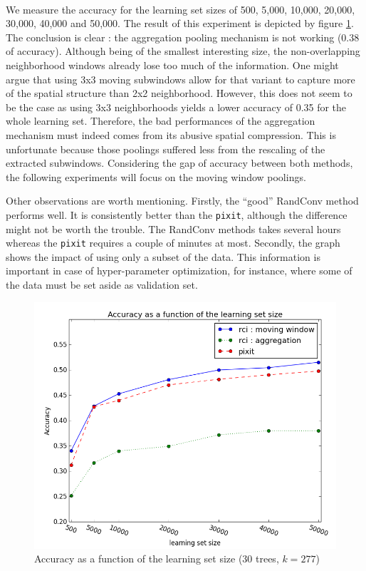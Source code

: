 \documentclass[a4paper]{report}
\begin{document}
		\paragraph{}
		We measure the accuracy for the learning set sizes of 500, 5,000, 10,000, 20,000, 30,000, 40,000 and 50,000. The result of this experiment is depicted by figure \ref{fig:accFLSsize}. The conclusion is clear : the aggregation pooling mechanism is not working (0.38 of accuracy). Although being of the smallest interesting size, the non-overlapping neighborhood windows already lose too much of the information. One might argue that using 3x3 moving subwindows allow for that variant to capture more of the spatial structure than 2x2 neighborhood. However, this does not seem to be the case as using 3x3 neighborhoods yields a lower accuracy of 0.35 for the whole learning set. Therefore, the bad performances of the aggregation mechanism must indeed comes from its abusive spatial compression. This is unfortunate because those poolings suffered less from the rescaling of the extracted subwindows. Considering the gap of accuracy between both methods, the following experiments will focus on the moving window poolings.
		\par
		Other observations are worth mentioning. Firstly, the ``good'' RandConv method performs well. It is consistently better than the \texttt{pixit}, although the difference might not be worth the trouble. The RandConv methods takes several hours whereas the \texttt{pixit} requires a couple of minutes at most. 
		Secondly, the graph shows the impact of using only a subset of the data. This information is important in case of hyper-parameter optimization, for instance, where some of the data must be set aside as validation set.
		
		\begin{figure}
			\centering
				\includegraphics[width=1.0\textwidth]{images/accFLSsize.png}
			\caption{\label{fig:accFLSsize}Accuracy as a function of the learning set size (30 trees, $k=277$)}
		\end{figure}
		
\end{document}
